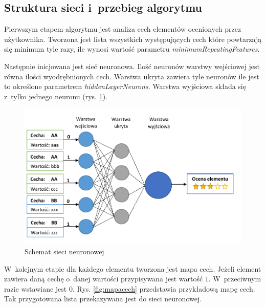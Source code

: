 \documentclass[twoside]{iisthesis}
\begin{document}
	 \subsection{Struktura sieci i~przebieg algorytmu}
	 \label{ss:strukturasiecineuronowej}		 
		 Pierwszym etapem algorytmu jest analiza cech elementów ocenionych przez użytkownika. Tworzona jest lista wszystkich występujących cech które powtarzają się minimum tyle razy, ile wynosi wartość  parametru \textit{minimumRepeatingFeatures}. 
		 
		 Następnie inicjowana jest sieć neuronowa. Ilość neuronów warstwy wejściowej jest równa ilości wyodrębnionych cech. Warstwa ukryta zawiera tyle neuronów ile jest to określone parametrem \textit{hiddenLayerNeurons}. Warstwa wyjściowa składa się z~tylko jednego neuronu (rys. \ref{fig:siecneuronowa}). 
		 
		 \begin{figure}%
		 	\centering
		 	\includegraphics[width=1\textwidth]{siecneuronowa}
		 	\caption{Schemat sieci neuronowej}
		 	\label{fig:siecneuronowa}
		 \end{figure}
		 
		 W~kolejnym etapie dla każdego elementu tworzona jest mapa cech. Jeżeli element zawiera daną cechę o~danej wartości przypisywana jest wartość $1$. W~przeciwnym razie wstawiane jest $0$. Rys. \ref{fig:mapacech} przedstawia przykładową mapę cech. Tak przygotowana lista przekazywana jest do sieci neuronowej. 
		 
\end{document}
